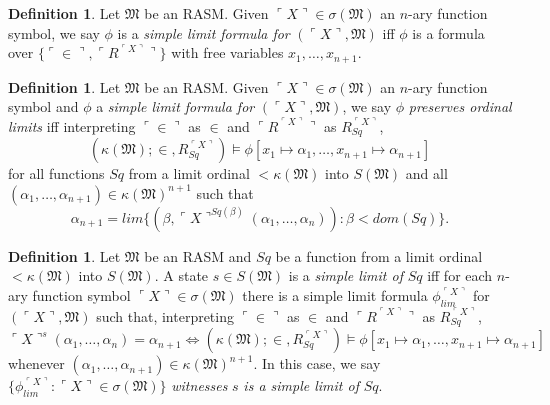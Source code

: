 \documentclass[12pt, twoside]{memoir}
\numberwithin{equation}{section}
\theoremstyle{definition}
\newtheorem{defi}[thm]{Definition}
\theoremstyle{remark}
\theoremstyle{definition}
\theoremstyle{definition}
\theoremstyle{definition}
\theoremstyle{remark}
\begin{document}
\begin{defi}
Let $\mathfrak{M}$ be an RASM. Given $\ulcorner X \urcorner \in \sigma(\mathfrak{M})$ an $n$-ary function symbol, we say $\phi$ is a \emph{simple limit formula for} $(\ulcorner X \urcorner, \mathfrak{M})$ iff $\phi$ is a formula over $\{\ulcorner \in \urcorner, \ulcorner R^{\ulcorner X \urcorner} \urcorner\}$ with free variables $x_1, \dots, x_{n+1}$.
\end{defi}

\begin{defi}\label{def234c}
Let $\mathfrak{M}$ be an RASM. Given $\ulcorner X \urcorner \in \sigma(\mathfrak{M})$ an $n$-ary function symbol and $\phi$ a \emph{simple limit formula for} $(\ulcorner X \urcorner, \mathfrak{M})$, we say $\phi$ \emph{preserves ordinal limits} iff interpreting $\ulcorner \in \urcorner$ as $\in$ and $\ulcorner R^{\ulcorner X \urcorner} \urcorner$ as $R_{Sq}^{\ulcorner X \urcorner}$, 
\begin{equation*}
    (\kappa(\mathfrak{M}); \in, R_{Sq}^{\ulcorner X \urcorner}) \models \phi[x_1 \mapsto \alpha_1, \dots, x_{n+1} \mapsto \alpha_{n+1}]
\end{equation*}
for all functions $Sq$ from a limit ordinal $< \kappa(\mathfrak{M})$ into $S(\mathfrak{M})$ and all $(\alpha_1, \dots, \alpha_{n+1}) \in \kappa(\mathfrak{M})^{n+1}$ such that 
\begin{equation*}
    \alpha_{n+1} = lim \{(\beta, \ulcorner X \urcorner^{Sq(\beta)}(\alpha_1, \dots, \alpha_n)) : \beta < dom(Sq)\} \text{.}
\end{equation*}
\end{defi}

\begin{defi}\label{def234}
Let $\mathfrak{M}$ be an RASM and $Sq$ be a function from a limit ordinal $< \kappa(\mathfrak{M})$ into $S(\mathfrak{M})$. A state $s \in S(\mathfrak{M})$ is a \emph{simple limit of} $Sq$ iff for each $n$-ary function symbol $\ulcorner X \urcorner \in \sigma(\mathfrak{M})$ there is a simple limit formula $\phi_{lim}^{\ulcorner X \urcorner}$ for $(\ulcorner X \urcorner, \mathfrak{M})$ such that, interpreting $\ulcorner \in \urcorner$ as $\in$ and $\ulcorner R^{\ulcorner X \urcorner} \urcorner$ as $R_{Sq}^{\ulcorner X \urcorner}$, 
\begin{equation*}
    \ulcorner X \urcorner^s (\alpha_1, \dots, \alpha_n) = \alpha_{n+1} \iff (\kappa(\mathfrak{M}); \in, R_{Sq}^{\ulcorner X \urcorner}) \models \phi[x_1 \mapsto \alpha_1, \dots, x_{n+1} \mapsto \alpha_{n+1}]
\end{equation*}
whenever $(\alpha_1, \dots, \alpha_{n+1}) \in \kappa(\mathfrak{M})^{n+1}$. In this case, we say $\{\phi_{lim}^{\ulcorner X \urcorner} : \ulcorner X \urcorner \in \sigma(\mathfrak{M})\}$ \emph{witnesses} $s$ \emph{is a simple limit of} $Sq$.
\end{defi}
\end{document}
